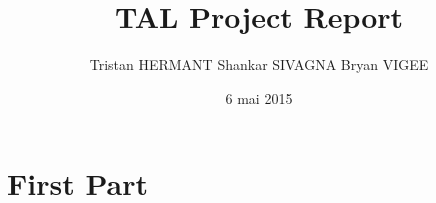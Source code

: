 \documentclass{report}
\title{TAL Project Report}
\author{Tristan HERMANT Shankar SIVAGNA Bryan VIGEE}
\date{6 mai 2015}
\begin{document}
\maketitle
\tableofcontents
\part{First Part}
\end{document}
